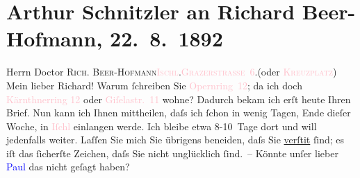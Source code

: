 

               \section[Arthur Schnitzler an Richard Beer-Hofmann, 22. 8. 1892]{ Arthur Schnitzler an Richard Beer-Hofmann, 22. 8. 1892}\nopagebreak{}\rehead{ }\normalsize\beginnumbering{} \toendnotes[C]{\smallbreak\pagebreak[2]} 
\toendnotes[C]{\smallbreak}\pstart{}{\pb}Herrn Doctor \textsc{Rich. Beer-Hofmann}\pend{}\pstart{}\textsc{\textcolor{pink}{Ischl}{}\ledrightnote{\textcolor{pink}{Bad Ischl}}.}\pend{}\pstart{}\textsc{\textcolor{pink}{Grazerstraße 6}{}\ledrightnote{\textcolor{pink}{Grazer Straße}}}.\pend{}\pstart{}(oder \textcolor{pink}{\textsc{Kreuzplatz}}{}\ledrightnote{\textcolor{pink}{Kreuzplatz}})\pend{}{\bigskip}\pstart
           \noindent{}{\pb}Mein lieber Richard! Warum ſchreiben Sie \textcolor{pink}{Opernring 12}{}\ledrightnote{\textcolor{pink}{Opernring}}; da ich doch \textcolor{pink}{Kärnthnerring
                  12}{}\ledrightnote{\textcolor{pink}{Kärntnerring}} oder \textcolor{pink}{Giſelastr. 11}{}\ledrightnote{\textcolor{pink}{Bösendorferstraße}} wohne?
               Dadurch bekam ich erſt heute Ihren Brief. Nun kann ich Ihnen mittheilen, daſs ich
               ſchon in wenig Tagen, Ende dieſer Woche, in \textcolor{pink}{Iſchl}{}\ledrightnote{\textcolor{pink}{Bad Ischl}}
               einlangen werde. Ich bleibe etwa 8-10 Tage dort und will jedenfalls weiter. Laſſen
               Sie mich Sie übrigens beneiden, {\pb}daſs Sie \uline{verſti{\geminationm}t}{ }ſind; es iſt das
               ſicherſte Zeichen, daſs Sie nicht unglücklich ſind. –\pend
           \pstart
           Könnte unſer lieber \textcolor{blue}{Paul}{}\ledrightnote{\textcolor{blue}{Paul Goldmann}} das nicht geſagt haben?
